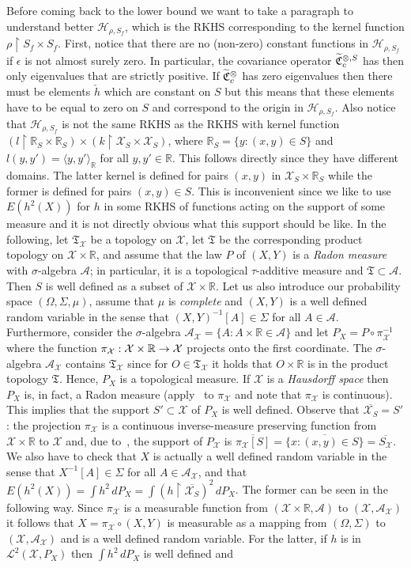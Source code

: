 \documentclass[10pt]{amsart}
\theoremstyle{definition}\newtheorem{defi}[theo]{Definition}\newtheorem{rema}[theo]{Remark}\newtheorem{exam}[theo]{Example}\newtheorem{exem}[theo]{Example}\newtheorem{nota}[theo]{Notation}
\theoremstyle{remark}
\newcommand{\restrr}
{\!\!\upharpoonright\!\!}
\newcommand{\R}{\mathbb{R}}
\newcommand{\X}{\mathcal{X}}
\newcommand{\clA}{\mathcal{A}}
\newcommand{\cH}{\mathcal{H}}
\newcommand{\clL}{\mathcal{L}}
\newcommand{\fkC}{\mathfrak{C}}
\newcommand{\fkT}{\mathfrak{T}}
\newcommand{\Cov}{\tilde{\fkC}}
\let\oldtilde\tilde
\renewcommand*{\tilde}[1]{\mathchoice{\widetilde{#1}}{\widetilde{#1}}{\oldtilde{#1}}{\oldtilde{#1}}}
\renewcommand*{\to}{\mathchoice{\longrightarrow}{\rightarrow}{\rightarrow}{\rightarrow}}
\begin{document}
Before coming back to the lower bound we want to take a paragraph to understand better $\cH_{\rho,S_f}$, which is the RKHS corresponding to the kernel function $\rho\restrr S_f \times S_f$. First, notice that there are no (non-zero) constant functions in $\cH_{\rho,S_f}$ if $\epsilon$ is not almost surely zero. In particular, the covariance operator $\Cov_c^{\otimes,S}$ has then only eigenvalues that are strictly positive. If $\Cov_c^{\otimes}$ has zero eigenvalues then there must be elements $\check h$ which are constant on $S$ but this means that these elements have to be equal to zero on $S$ and correspond to the origin in $\cH_{\rho,S_f}$. Also notice that $\cH_{\rho,S_f}$ is not the same RKHS as the RKHS with kernel function $(l \restrr \R_S \times \R_S) \times (k \restrr \X_S \times \X_S)$, where $\R_S = \{y: (x,y) \in S\}$ and $l(y,y') = \langle y,y' \rangle_\R$ for all $y,y' \in \R$. This follows directly since they have different domains. The latter kernel is defined for pairs $(x,y)$ in $\X_S \times \R_S$ while the former is defined for pairs $(x,y) \in S$. This is inconvenient since we like to use $E(h^2(X))$ for $h$ in some RKHS of functions acting on the support of some measure and it is not directly obvious what this support should be like. In the following, let $\fkT_\X$ be a topology on $\X$, let $\fkT$ be the corresponding product topology on $\X \times \R$, and assume that the law $P$ of $(X,Y)$ is a \emph{Radon measure} with $\sigma$-algebra $\clA$; in particular, it is a topological $\tau$-additive measure and $\fkT \subset \clA$. Then $S$ is well defined as a subset of $\X \times \R$. Let us also introduce our probability space $(\Omega,\Sigma,\mu)$, assume that $\mu$ is \emph{complete} and $(X,Y)$ is a well defined random variable in the sense that $(X,Y)^{-1}[A] \in \Sigma$ for all $A \in \clA$. Furthermore, consider the $\sigma$-algebra $\clA_\X = \{A : A \times \R \in \clA\}$ and let $P_X = P \circ \pi_\X^{-1}$ where the function $\pi_\X: \X \times \R \to \X$ projects onto the first coordinate. The $\sigma$-algebra $\clA_\X$ contains $\fkT_\X$ since for $O \in \fkT_\X$ it holds that $O \times \R$ is in the product topology $\fkT$. Hence, $P_X$ is a topological measure. If $\X$ is a \emph{Hausdorff space} then $P_X$ is, in fact, a Radon measure (apply~\cite[418I]{FREM} to $\pi_\X$ and note that $\pi_\X$ is continuous). This implies that the support $S' \subset \X$ of $P_X$ is well defined. Observe that $\overline{\X_S} = S'$: the projection $\pi_\X$ is a continuous inverse-measure preserving function from $\X \times \R $ to $\X$ and, due to~\cite[411N.e]{FREM}, the support of $P_\X$ is $\overline{\pi_\X[S]} = \overline{ \{ x : (x,y) \in S\} } = \overline{S_\X}$. We also have to check that $X$ is actually a well defined random variable in the sense that $X^{-1}[A] \in \Sigma$ for all $A \in \clA_\X$, and that $E(h^2(X)) = \int h^2 \, dP_X = \int (h\!\restrr \overline{\X_S})^2 \, dP_X$. The former can be seen in the following way. Since $\pi_\X$ is a measurable function from $(\X \times \R, \clA)$ to $(\X, \clA_\X)$ it follows that $X = \pi_\X \circ (X,Y)$ is measurable as a mapping from $(\Omega,\Sigma)$ to $(\X,\clA_\X)$ and is a well defined random variable. For the latter, if $h$ is in $\clL^2(\X, P_X)$ then $\int h^2 \,dP_X$ is well defined and 
\end{document}
